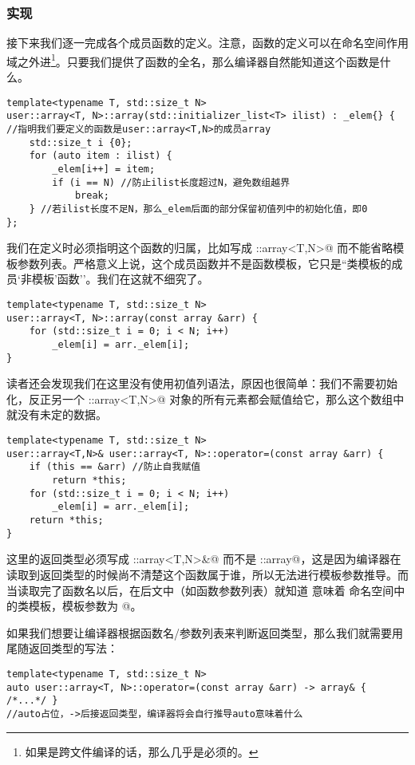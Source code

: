\subsubsection*{实现}
接下来我们逐一完成各个成员函数的定义。注意，函数的定义可以在命名空间作用域之外进\footnote{如果是跨文件编译的话，那么几乎是必须的。}。只要我们提供了函数的全名，那么编译器自然能知道这个函数是什么。
\begin{lstlisting}
template<typename T, std::size_t N>
user::array<T, N>::array(std::initializer_list<T> ilist) : _elem{} {
//指明我们要定义的函数是user::array<T,N>的成员array
    std::size_t i {0};
    for (auto item : ilist) {
        _elem[i++] = item;
        if (i == N) //防止ilist长度超过N，避免数组越界
            break;
    } //若ilist长度不足N，那么_elem后面的部分保留初值列中的初始化值，即0
};
\end{lstlisting}
我们在定义时必须指明这个函数的归属，比如写成 \lstinline@user::array<T,N>@ 而不能省略模板参数列表。严格意义上说，这个成员函数并不是函数模板，它只是``类模板的成员`非模板'函数''。我们在这就不细究了。\par
\begin{lstlisting}
template<typename T, std::size_t N>
user::array<T, N>::array(const array &arr) {
    for (std::size_t i = 0; i < N; i++)
        _elem[i] = arr._elem[i];
}
\end{lstlisting}
读者还会发现我们在这里没有使用初值列语法，原因也很简单：我们不需要初始化，反正另一个 \lstinline@user::array<T,N>@ 对象的所有元素都会赋值给它，那么这个数组中就没有未定的数据。\par
\begin{lstlisting}
template<typename T, std::size_t N>
user::array<T,N>& user::array<T, N>::operator=(const array &arr) {
    if (this == &arr) //防止自我赋值
        return *this;
    for (std::size_t i = 0; i < N; i++)
        _elem[i] = arr._elem[i];
    return *this;
}
\end{lstlisting}
这里的返回类型必须写成 \lstinline@user::array<T,N>&@ 而不是 \lstinline@user::array@，这是因为编译器在读取到返回类型的时候尚不清楚这个函数属于谁，所以无法进行模板参数推导。而当读取完了函数名以后，在后文中（如函数参数列表）就知道 \lstinline@array@ 意味着 \lstinline@user@ 命名空间中的类模板，模板参数为 @。\par
如果我们想要让编译器根据函数名/参数列表来判断返回类型，那么我们就需要用尾随返回类型的写法：
\begin{lstlisting}
template<typename T, std::size_t N>
auto user::array<T, N>::operator=(const array &arr) -> array& { /*...*/ }
//auto占位，->后接返回类型，编译器将会自行推导auto意味着什么
\end{lstlisting}\pagebreak
